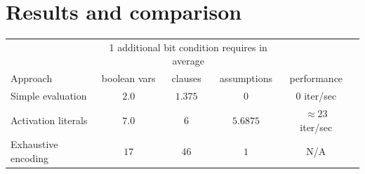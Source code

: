 \section{Results and comparison}
%
%
\begin{table}
 \begin{center}
  \begin{tabular}{lccccc}
                               & \multicolumn{3}{c}{1 additional bit condition requires in average} & \\
   Approach                    & boolean vars & clauses & assumptions   & performance \\
  \hline
   Simple evaluation           & $2.0$        & $1.375$ & $0$           & $0$ iter/sec \\
   Activation literals         & $7.0$        & $6$     & $5.6875$      & $\approx23$ iter/sec \\
   Exhaustive encoding         & $17$         & $46$    & $1$           & N/A \\

\end{tabular}
\end{center}
\end{table}

